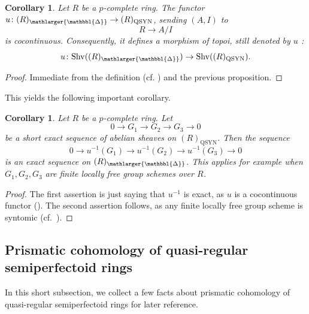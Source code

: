 \documentclass{amsart}
\newcommand{\prism}{{\mathlarger{\mathbbl{\Delta}}}}
\theoremstyle{plain}
\newtheorem{corollary}[theorem]{Corollary}
\theoremstyle{definition}
\newcommand{\orange}[1]{{\color{black}#1}}
\newcommand{\blue}[1]{{\color{black}#1}}
\begin{document}
\begin{corollary}
  \label{sec:quasi-syntomic-rings-morphism-of-topoi-from-prismatic-topos}
Let $R$ be a $p$-complete ring. The functor $u\colon (R)_{\prism} \to (R)_{\mathrm{QSYN}}$, sending $(A,I)$
to $$R \to A/I$$ is cocontinuous. Consequently, it defines a morphism of
topoi, still denoted by $u$ :
        \[ u\colon  \mathrm{Shv}((R)_{\prism}) \to \mathrm{Shv}((R)_{\mathrm{QSYN}}).
 \]
 \end{corollary}
\begin{proof}
Immediate from the definition (cf. \cite[Tag 00XJ]{stacks_project}) and the previous proposition.
\end{proof}


This yields the following important corollary. 

\begin{corollary}
        \label{sec:prismatic-to-syntomic-corollary-exactness-if-kernel-is-affine-p-completely-syntomic}
        Let $R$ be a $p$-complete ring. Let $$0\to G_1\to G_2\to G_3\to 0$$ be a short
exact sequence of abelian sheaves on $(R)_{\mathrm{QSYN}}$. Then
the sequence
        $$
        0\to u^{-1}(G_1)\to u^{-1}(G_2)\to u^{-1}(G_3)\to 0
        $$
        is an exact sequence on $(R)_{\prism}$. This applies for example when $G_1, G_2,
G_3$ are finite locally free group schemes over $R$.
\end{corollary}
\begin{proof}
The first assertion is just saying that $u^{-1}$ is exact, as $u$ is a
cocontinuous functor (\cite[Tag 00XL]{stacks_project}). The second assertion follows, as
any finite locally free group scheme is syntomic (cf.\ \cite[Proposition 2.2.2]{breuil_groupes_p_divisibles_groupes_finis_et_modules_filtres}).   
\end{proof}



\subsection{Prismatic cohomology of quasi-regular semiperfectoid rings}
\label{sec:prism-cohom-quasi-regular semiperfectoid}

\blue{In this short subsection, we collect a few facts about prismatic cohomology of quasi-regular semiperfectoid rings for later reference.}
\end{document}
